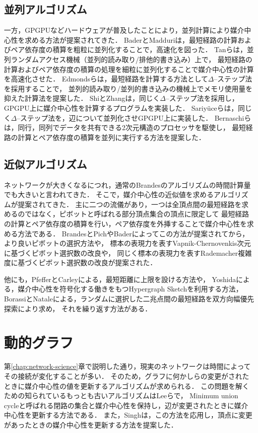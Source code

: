 \subsection{並列アルゴリズム}
一方，GPGPUなどハードウェアが普及したことにより，並列計算により媒介中心性を求める方法が提案されてきた．
BaderとMadduri\cite{Bader2006}は，最短経路の計算およびペア依存度の積算を粗粒に並列化することで，高速化を図った．
Tanら\cite{Tan2009}は，並列ランダムアクセス機械（並列的読み取り/排他的書き込み）上で，
最短経路の計算およびペア依存度の積算の処理を細粒に並列化することで媒介中心性の計算を高速化させた．
Edmondsら\cite{Edmonds2010}は，最短経路を計算する方法として$\Delta$--ステップ法を採用することで，
並列的読み取り/並列的書き込みの機械上でメモリ使用量を抑えた計算法を提案した．
ShiとZhang\cite{Shi2011}は，同じく$\Delta$--ステップ法を採用し，GPGPU上に媒介中心性を計算するプログラムを実装した．
Sariy{\"{u}}ceら\cite{Sariyuce2013}は，同じく$\Delta$--ステップ法を，辺について並列化させGPGPU上に実装した．
Bernaschiら\cite{Bernaschi2016}は，同行，同列でデータを共有できる2次元構造のプロセッサを駆使し，
最短経路の計算とペア依存度の積算を並列に実行する方法を提案した．

\subsection{近似アルゴリズム}
ネットワークが大きくなるにつれ，通常のBrandesのアルゴリズムの時間計算量でも大きいと言われてきた．
そこで，媒介中心性の近似値を求めるアルゴリズムが提案されてきた．
主に二つの流儀があり，一つは全頂点間の最短経路を求めるのではなく，ピボットと呼ばれる部分頂点集合の頂点に限定して
最短経路の計算とペア依存度の積算を行い，ペア依存度を外挿することで媒介中心性を求める方法である\cite{Brandes2007}．
BrandesとPich\cite{Brandes2007}やBader\cite{Bader2007}によってこの方法が提案されてから，
より良いピボットの選択方法\cite{Geisberger2008,Chehreghani2014}や，
標本の表現力を表すVapnik-Chernovenkis次元に基づくピボット選択数の改良\cite{Riondato2014}や，
同じく標本の表現力を表すRademacher複雑度に基づくピボット選択数の改良\cite{Riondato2016}が提案された．

他にも，PfefferとCarleyによる，最短距離に上限を設ける方法\cite{Pfeffer2012}や，
Yoshidaによる，媒介中心性を符号化する働きをもつHypergraph Sketchを利用する方法\cite{Yoshida2014}，
BorassiとNataleによる，ランダムに選択した二兆点間の最短経路を双方向幅優先探索により求め，
それを繰り返す方法\cite{Borassi2019}がある．

\section{動的グラフ}
第\ref{chap:network-science}章で説明した通り，現実のネットワークは時間によってその接続が変化することが多い．
そのため，グラフに何かしらの変更がされたときに媒介中心性の値を更新するアルゴリズムが求められる．
この問題を解くための知られているもっとも古いアルゴリズムはLeeら\cite{Lee2012}で，
Minimum union cycleと呼ばれる閉路の集合と媒介中心性を保持し，辺が変更されたときに媒介中心性を更新する方法である．
また，Singh\cite{Singh2015}は，この方法を応用し，頂点に変更があったときの媒介中心性を更新する方法を提案した．

